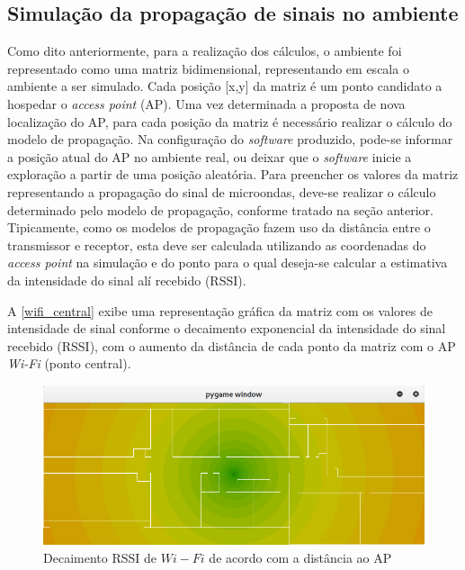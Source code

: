 \documentclass[
	12pt,				%
	twoside,			%
	a4paper,			%
	english,			%
	french,				%
	spanish,			%
	brazil				%
	]{abntex2}
\begin{document}
\subsection{Simulação da propagação de sinais no
ambiente}\label{simulauxe7uxe3o-da-propagauxe7uxe3o-de-sinais-no-ambiente}

Como dito anteriormente, para a realização dos cálculos, o ambiente foi
representado como uma matriz bidimensional, representando em escala o
ambiente a ser simulado. Cada posição {[}x,y{]} da matriz é um ponto
candidato a hospedar o \emph{access point} (AP). Uma vez determinada a
proposta de nova localização do AP, para cada posição da matriz é
necessário realizar o cálculo do modelo de propagação. Na configuração
do \emph{software} produzido, pode-se informar a posição atual do AP no
ambiente real, ou deixar que o \emph{software} inicie a exploração a
partir de uma posição aleatória. Para preencher os valores da matriz
representando a propagação do sinal de microondas, deve-se realizar o
cálculo determinado pelo modelo de propagação, conforme tratado na seção
anterior. Tipicamente, como os modelos de propagação fazem uso da
distância entre o transmissor e receptor, esta deve ser calculada
utilizando as coordenadas do \emph{access point} na simulação e do ponto
para o qual deseja-se calcular a estimativa da intensidade do sinal alí
recebido (RSSI).

A \autoref{wifi_central} exibe uma representação gráfica da matriz com
os valores de intensidade de sinal conforme o decaimento exponencial da
intensidade do sinal recebido (RSSI), com o aumento da distância de cada
ponto da matriz com o AP \emph{Wi-Fi} (ponto central).

\begin{figure}[htb]
    \caption{\label{wifi_central} Decaimento RSSI de $Wi-Fi$ de acordo com a distância ao AP}
    \begin{center}
        \includegraphics[scale=0.5]{imagens/wifi-central.jpg}
    \end{center}
\end{figure}
\end{document}
